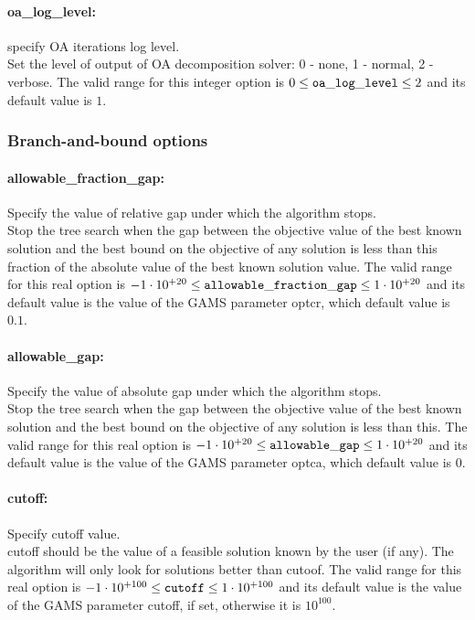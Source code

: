 \paragraph{oa\_log\_level:}\label{sec:oa_log_level} specify OA iterations log level. $\;$ \\
 Set the level of output of OA decomposition
solver: 0 - none, 1 - normal, 2 - verbose. The valid range for this integer option is
$0 \le {\tt oa\_log\_level } \le 2$
and its default value is $1$.

\subsubsection{Branch-and-bound options}
\label{sec:Branch-and-bound_options}

\paragraph{allowable\_fraction\_gap:}\label{sec:allowable_fraction_gap} Specify the value of relative gap under which the algorithm stops. $\;$ \\
 Stop the tree search when the gap between the
objective value of the best known solution and
the best bound on the objective of any solution
is less than this fraction of the absolute value
of the best known solution value. The valid range for this real option is 
$-1 \cdot 10^{+20} \le {\tt allowable\_fraction\_gap } \le 1 \cdot 10^{+20}$
and its default value is the value of the GAMS parameter optcr, which default value is $0.1$.


\paragraph{allowable\_gap:}\label{sec:allowable_gap} Specify the value of absolute gap under which the algorithm stops. $\;$ \\
 Stop the tree search when the gap between the
objective value of the best known solution and
the best bound on the objective of any solution
is less than this. The valid range for this real option is 
$-1 \cdot 10^{+20} \le {\tt allowable\_gap } \le 1 \cdot 10^{+20}$
and its default value is the value of the GAMS parameter optca, which default value is $0$.


\paragraph{cutoff:}\label{sec:cutoff} Specify cutoff value. $\;$ \\
 cutoff should be the value of a feasible solution
known by the user (if any). The algorithm will
only look for solutions better than cutoof. The valid range for this real option is 
$-1 \cdot 10^{+100} \le {\tt cutoff } \le 1 \cdot 10^{+100}$
and its default value is the value of the GAMS parameter cutoff, if set, otherwise it is $10^{100}$.


